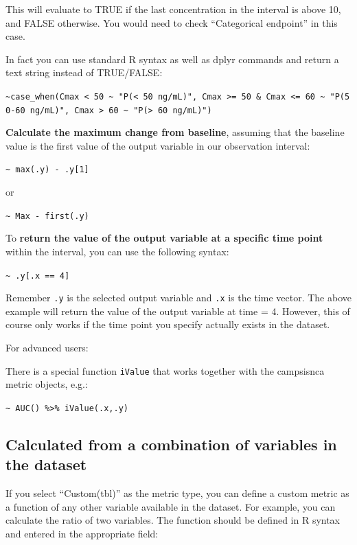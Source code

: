 \documentclass[
]{book}
\begin{document}
This will evaluate to TRUE if the last concentration in the interval is above 10, and FALSE otherwise. You would need to check ``Categorical endpoint'' in this case.

In fact you can use standard R syntax as well as dplyr commands and return a text string instead of TRUE/FALSE:

\texttt{\textasciitilde{}case\_when(Cmax\ \textless{}\ 50\ \textasciitilde{}\ "P(\textless{}\ 50\ ng/mL)",\ Cmax\ \textgreater{}=\ 50\ \&\ Cmax\ \textless{}=\ 60\ \textasciitilde{}\ "P(50-60\ ng/mL)",\ Cmax\ \textgreater{}\ 60\ \textasciitilde{}\ "P(\textgreater{}\ 60\ ng/mL)")}

\textbf{Calculate the maximum change from baseline}, assuming that the baseline value is the first value of the output variable in our observation interval:

\texttt{\textasciitilde{}\ max(.y)\ -\ .y{[}1{]}}

or

\texttt{\textasciitilde{}\ Max\ -\ first(.y)}

To \textbf{return the value of the output variable at a specific time point} within the interval, you can use the following syntax:

\texttt{\textasciitilde{}\ .y{[}.x\ ==\ 4{]}}

Remember \texttt{.y} is the selected output variable and \texttt{.x} is the time vector. The above example will return the value of the output variable at time = 4. However, this of course only works if the time point you specify actually exists in the dataset.

For advanced users:

There is a special function \texttt{iValue} that works together with the campsisnca metric objects, e.g.:

\texttt{\textasciitilde{}\ AUC()\ \%\textgreater{}\%\ iValue(.x,.y)}

\subsection{Calculated from a combination of variables in the dataset}\label{calculated-from-a-combination-of-variables-in-the-dataset}

If you select ``Custom(tbl)'' as the metric type, you can define a custom metric as a function of any other variable available in the dataset. For example, you can calculate the ratio of two variables. The function should be defined in R syntax and entered in the appropriate field:
\end{document}

